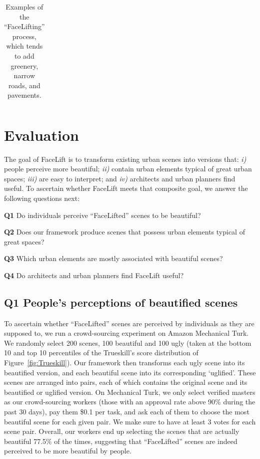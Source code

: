 \begin{table}
\begin{tabular}{l*3{C}@{}}
        \bottomrule 
    \end{tabular}
    \caption{Examples of the ``FaceLifting'' process, which tends to add greenery, narrow roads, and  pavements.}
    \label{fig:BeautyExample}
\end{table} 




\section{Evaluation}
\label{sec:evaluation}

The goal of FaceLift is to transform existing urban scenes into versions that: \emph{i)} people perceive more beautiful; \emph{ii)} contain urban elements typical of great urban spaces; \emph{iii)} are easy to interpret; and \emph{iv)} architects and urban planners find useful. To ascertain whether FaceLift meets that composite goal, we answer the following questions next: 

\begin{description}
    \item{\textbf{Q1}} Do individuals perceive ``FaceLifted'' scenes to be beautiful?
    
    \item{\textbf{Q2}}  Does our framework produce scenes that possess urban elements typical of great spaces?
    
    \item{\textbf{Q3}}  Which urban elements are mostly associated with beautiful scenes?
    
    \item{\textbf{Q4}}  Do architects and urban planners find FaceLift useful?
    
\end{description}


\subsection*{Q1 People's perceptions of beautified scenes}
To ascertain whether ``FaceLifted'' scenes are perceived by individuals as they are supposed to, we run a crowd-sourcing experiment on Amazon Mechanical Turk.  We randomly select 200 scenes, 100 beautiful and 100 ugly  (taken at the bottom 10 and top 10 percentiles of the Trueskill's score distribution of Figure~\ref{fig:Trueskill}). Our framework then transforms each ugly scene into its beautified version, and each beautiful scene into its corresponding `uglified'. These scenes are arranged into pairs, each of which contains the original scene and its beautified or uglified version. On  Mechanical Turk, we only select verified masters as our crowd-sourcing workers (those with an approval rate above 90\% during the past 30 days), pay them \$0.1 per  task,  and ask each of them to choose the most beautiful scene for each given pair.  We make sure to have at least 3 votes for each scene pair. Overall, our workers end up selecting the scenes that are actually beautiful 77.5\% of the times, suggesting that ``FaceLifted'' scenes are indeed perceived to be more beautiful by people. 

